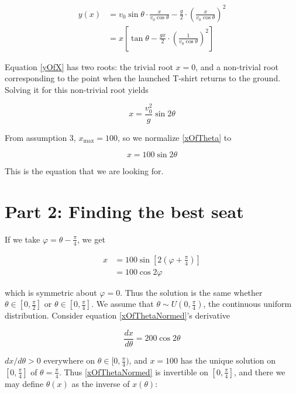 \documentclass[]{article}
\begin{document}
\begin{align}
y(x) &= v_0 \sin\theta \cdot \frac{x}{v_0 \cos\theta} - \frac{g}{2}\cdot \left(\frac{x}{v_0 \cos\theta}\right)^2\nonumber\\
&= x\left[\tan\theta - \frac{gx}{2}\cdot \left(\frac{1}{v_0 \cos\theta}\right)^2 \right]\label{yOfX}
\end{align}

\noindent Equation \eqref{yOfX} has two roots: the trivial root $x=0$, and a non-trivial root corresponding to the point when the launched T-shirt returns to the ground. Solving it for this non-trivial root yields

\begin{equation}\label{xOfTheta}
x = \frac{v_0^2}{g}\sin 2\theta
\end{equation}

\noindent From assumption 3, $x_{\max}=100$, so we normalize \eqref{xOfTheta} to

\begin{equation}\label{xOfThetaNormed}
x = 100 \sin 2\theta
\end{equation} 

\noindent This is the equation that we are looking for.

\section*{Part 2: Finding the best seat}

If we take $\varphi = \theta-\frac{\pi}{4}$, we get

\begin{align}
x &= 100 \sin \left[2\left(\varphi + \frac{\pi}{4}\right)\right]\nonumber\\
&= 100 \cos 2\varphi
\end{align}

\noindent which is symmetric about $\varphi = 0$. Thus the solution is the same whether $\theta\in[0, \frac{\pi}{2}]$ or $\theta\in [0, \frac{\pi}{4}]$. We  assume that $\theta\sim U(0, \frac{\pi}{4})$, the continuous uniform distribution. Consider equation \eqref{xOfThetaNormed}'s derivative

\begin{equation}\label{dTheta}
\frac{dx}{d\theta} = 200 \cos 2\theta
\end{equation}

\noindent $dx/d\theta > 0$ everywhere on $\theta\in[0, \frac{\pi}{4})$, and $x=100$ has the unique solution on $[0, \frac{\pi}{4}]$ of $\theta = \frac{\pi}{4}$. Thus \eqref{xOfThetaNormed} is invertible on $[0, \frac{\pi}{4}]$, and there we may define $\theta(x)$ as the inverse of $x(\theta)$:
\end{document}
